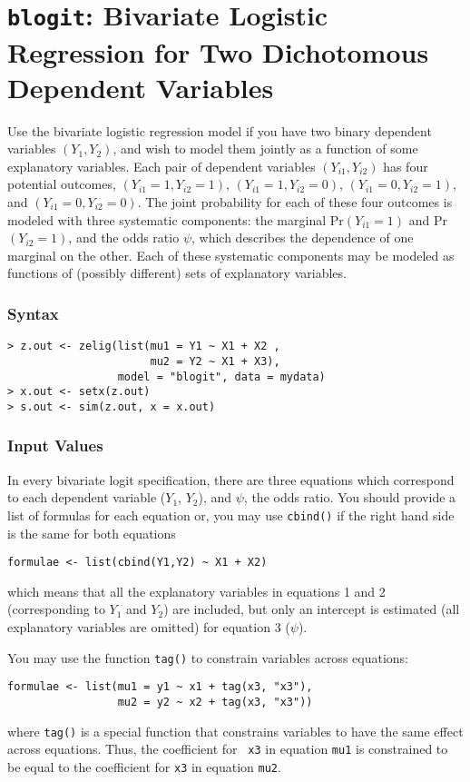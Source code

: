 \section{{\tt blogit}: Bivariate Logistic Regression for Two
Dichotomous Dependent Variables}\label{blogit}

Use the bivariate logistic regression model if you have two binary
dependent variables $(Y_1, Y_2)$, and wish to model them jointly as a
function of some explanatory variables.  Each pair of dependent
variables $(Y_{i1}, Y_{i2})$ has four potential outcomes, $(Y_{i1}=1,
Y_{i2}=1)$, $(Y_{i1}=1, Y_{i2}=0)$, $(Y_{i1}=0, Y_{i2}=1)$, and
$(Y_{i1}=0, Y_{i2}=0)$.  The joint probability for each of these four
outcomes is modeled with three systematic components: the marginal
Pr$(Y_{i1} = 1)$ and Pr$(Y_{i2} = 1)$, and the odds ratio $\psi$,
which describes the dependence of one marginal on the other.  Each of
these systematic components may be modeled as functions of (possibly
different) sets of explanatory variables.

\subsubsection{Syntax}

\begin{verbatim}
> z.out <- zelig(list(mu1 = Y1 ~ X1 + X2 , 
                      mu2 = Y2 ~ X1 + X3), 
                 model = "blogit", data = mydata)
> x.out <- setx(z.out)
> s.out <- sim(z.out, x = x.out)
\end{verbatim}

\subsubsection{Input Values}

In every bivariate logit specification, there are three equations which
correspond to each dependent variable ($Y_1$, $Y_2$), and $\psi$, the
odds ratio. You should provide a list of formulas for each equation or, 
you may use {\tt cbind()} if the right hand side is the same for both equations
\begin{verbatim}
formulae <- list(cbind(Y1,Y2) ~ X1 + X2)
\end{verbatim}
which means that all the explanatory variables in equations 1 and 2
(corresponding to $Y_1$ and $Y_2$) are included, but only an intercept
is estimated (all explanatory variables are omitted) for equation 3
($\psi$).  

You may use the function {\tt tag()} to constrain variables across
equations:
\begin{verbatim}
formulae <- list(mu1 = y1 ~ x1 + tag(x3, "x3"), 
                 mu2 = y2 ~ x2 + tag(x3, "x3"))
\end{verbatim}
where {\tt tag()} is a special function that constrains variables to
have the same effect across equations.  Thus, the coefficient for {\tt
x3} in equation {\tt mu1} is constrained to be equal to the
coefficient for {\tt x3} in equation {\tt mu2}.  


